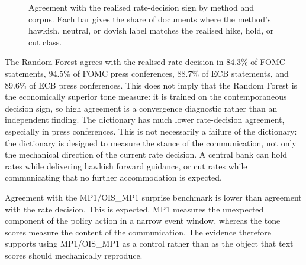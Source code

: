\begin{figure}[H]
  \centering
  \caption[Agreement with realised rate-decision sign]{Agreement with the
    realised rate-decision sign by method and corpus. Each bar gives the share
    of documents where the method's hawkish, neutral, or dovish label matches
    the realised hike, hold, or cut class.}
  \label{fig:agreement_with_rate_v31}
\end{figure}

The Random Forest agrees with the realised rate decision in 84.3\% of FOMC
statements, 94.5\% of FOMC press conferences, 88.7\% of ECB statements, and
89.6\% of ECB press conferences. This does not imply that the Random Forest is
the economically superior tone measure: it is trained on the contemporaneous
decision sign, so high agreement is a convergence diagnostic rather than an
independent finding. The dictionary has much lower rate-decision agreement,
especially in press conferences. This is not necessarily a failure of the
dictionary: the dictionary is designed to measure the stance of the
communication, not only the mechanical direction of the current rate decision.
A central bank can hold rates while delivering hawkish forward guidance, or
cut rates while communicating that no further accommodation is expected.

Agreement with the MP1/OIS\_MP1 surprise benchmark is lower than agreement
with the rate decision. This is expected. MP1 measures the unexpected
component of the policy action in a narrow event window, whereas the tone
scores measure the content of the communication. The evidence therefore
supports using MP1/OIS\_MP1 as a control rather than as the object that text
scores should mechanically reproduce.

